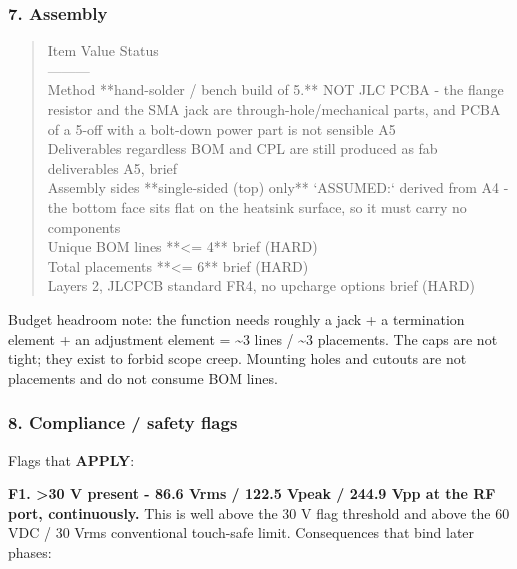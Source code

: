 \documentclass[11pt,a4paper]{article}
\begin{document}
\subsubsection*{7. Assembly}
\begin{quote}\small\ttfamily\raggedright
\textbar{} Item \textbar{} Value \textbar{} Status \textbar{}\\
\textbar{}---\textbar{}---\textbar{}---\textbar{}\\
\textbar{} Method \textbar{} {*}{*}hand-solder / bench build of 5.{*}{*} NOT JLC PCBA - the flange resistor and the SMA jack are through-hole/mechanical parts, and PCBA of a 5-off with a bolt-down power part is not sensible \textbar{} A5 \textbar{}\\
\textbar{} Deliverables regardless \textbar{} BOM and CPL are still produced as fab deliverables \textbar{} A5, brief \textbar{}\\
\textbar{} Assembly sides \textbar{} {*}{*}single-sided (top) only{*}{*} \textbar{} `ASSUMED:` derived from A4 - the bottom face sits flat on the heatsink surface, so it must carry no components \textbar{}\\
\textbar{} Unique BOM lines \textbar{} {*}{*}\textless{}= 4{*}{*} \textbar{} brief (HARD) \textbar{}\\
\textbar{} Total placements \textbar{} {*}{*}\textless{}= 6{*}{*} \textbar{} brief (HARD) \textbar{}\\
\textbar{} Layers \textbar{} 2, JLCPCB standard FR4, no upcharge options \textbar{} brief (HARD) \textbar{}
\end{quote}
Budget headroom note: the function needs roughly a jack + a termination element + an adjustment element = \textasciitilde{}3 lines / \textasciitilde{}3 placements. The caps are not tight; they exist to forbid scope creep. Mounting holes and cutouts are not placements and do not consume BOM lines.

\subsubsection*{8. Compliance / safety flags}
Flags that \textbf{APPLY}:

\textbf{F1. \textgreater{}30 V present - 86.6 Vrms / 122.5 Vpeak / 244.9 Vpp at the RF port, continuously.} This is well above the 30 V flag threshold and above the 60 VDC / 30 Vrms conventional touch-safe limit. Consequences that bind later phases:
\end{document}
